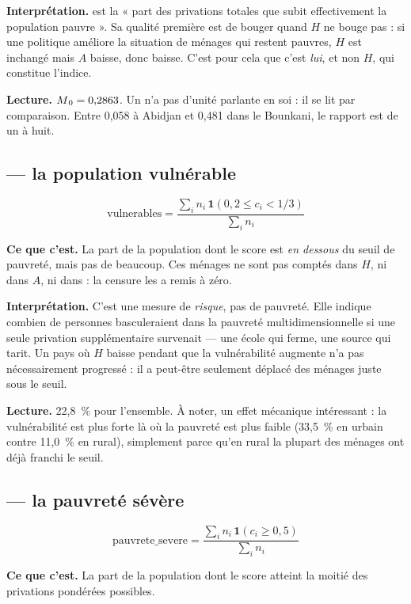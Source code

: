 \documentclass[11pt,a4paper]{article}
\begin{document}
\textbf{Interprétation.} \ipm{} est la « part des privations totales que subit effectivement la
population pauvre ». Sa qualité première est de bouger quand $H$ ne bouge pas : si une politique
améliore la situation de ménages qui restent pauvres, $H$ est inchangé mais $A$ baisse, donc \ipm{}
baisse. C'est pour cela que c'est \emph{lui}, et non $H$, qui constitue l'indice.

\textbf{Lecture.} $M\textsubscript{0} = 0{,}2863$. Un \ipm{} n'a pas d'unité parlante en soi : il se lit par
comparaison. Entre 0,058 à Abidjan et 0,481 dans le Bounkani, le rapport est de un à huit.

\subsection*{ --- la population vulnérable}

\[
\text{vulnerables} = \frac{\sum_i n_i \, \mathbf{1}\!\left(0{,}2 \le c_i < 1/3\right)}{\sum_i n_i}
\]

\textbf{Ce que c'est.} La part de la population dont le score est \emph{en dessous} du seuil de
pauvreté, mais pas de beaucoup. Ces ménages ne sont pas comptés dans $H$, ni dans $A$, ni dans
\ipm{} : la censure les a remis à zéro.

\textbf{Interprétation.} C'est une mesure de \emph{risque}, pas de pauvreté. Elle indique combien
de personnes basculeraient dans la pauvreté multidimensionnelle si une seule privation
supplémentaire survenait --- une école qui ferme, une source qui tarit. Un pays où $H$ baisse
pendant que la vulnérabilité augmente n'a pas nécessairement progressé : il a peut-être seulement
déplacé des ménages juste sous le seuil.

\textbf{Lecture.} 22,8~\% pour l'ensemble. À noter, un effet mécanique intéressant : la
vulnérabilité est plus forte là où la pauvreté est plus faible (33,5~\% en urbain contre 11,0~\%
en rural), simplement parce qu'en rural la plupart des ménages ont déjà franchi le seuil.

\subsection*{ --- la pauvreté sévère}

\[
\text{pauvrete\_severe} = \frac{\sum_i n_i \, \mathbf{1}(c_i \ge 0{,}5)}{\sum_i n_i}
\]

\textbf{Ce que c'est.} La part de la population dont le score atteint la moitié des privations
pondérées possibles.
\end{document}
